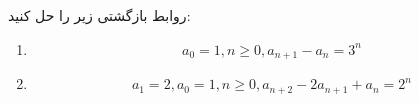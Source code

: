     \p 
روابط بازگشتی زیر را حل کنید:
\begin{enumerate}
\item
$$a_0 = 1, n \geq 0, a_{n+1} - a_n = 3^n$$
\item
$$a_1 = 2, a_0 = 1, n \geq 0, a_{n+2} - 2a_{n+1} + a_n = 2^n$$
\end{enumerate}